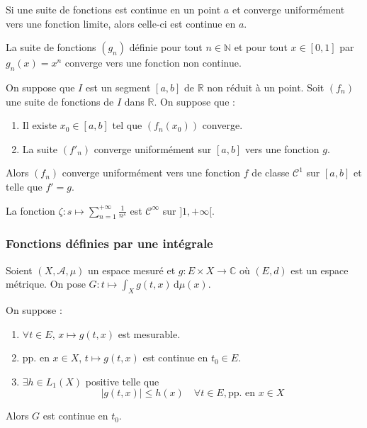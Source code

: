 
	\begin{proposition}
		Si une suite de fonctions est continue en un point $a$ et converge uniformément vers une fonction limite, alors celle-ci est continue en $a$.
	\end{proposition}

	\begin{cexample}
		La suite de fonctions $(g_n)$ définie pour tout $n \in \mathbb{N}$ et pour tout $x \in [0,1]$ par $g_n(x) = x^n$ converge vers une fonction non continue.
	\end{cexample}

	\begin{proposition}
		On suppose que $I$ est un segment $[a,b]$ de $\mathbb{R}$ non réduit à un point. Soit $(f_n)$ une suite de fonctions de $I$ dans $\mathbb{R}$. On suppose que :
		\begin{enumerate}[label=(\roman*)]
			\item Il existe $x_0 \in [a,b]$ tel que $(f_n(x_0))$ converge.
			\item La suite $(f'_n)$ converge uniformément sur $[a,b]$ vers une fonction $g$.
		\end{enumerate}
		Alors $(f_n)$ converge uniformément vers une fonction $f$ de classe $\mathcal{C}^1$ sur $[a,b]$ et telle que $f'=g$.
	\end{proposition}


	\begin{example}
		La fonction $\zeta : s \mapsto \sum_{n=1}^{+\infty} \frac{1}{n^s}$ est $\mathcal{C}^\infty$ sur $]1,+\infty[$.
	\end{example}

	\subsubsection{Fonctions définies par une intégrale}


	Soient $(X, \mathcal{A}, \mu)$ un espace mesuré et $g : E \times X \rightarrow \mathbb{C}$ où $(E, d)$ est un espace métrique. On pose $G : t \mapsto \int_X g(t, x) \, \mathrm{d}\mu(x)$.

	\begin{theorem}
		On suppose :
		\begin{enumerate}[label=(\roman*)]
			\item $\forall t \in E$, $x \mapsto g(t,x)$ est mesurable.
			\item pp. en $x \in X$, $t \mapsto g(t,x)$ est continue en $t_0 \in E$.
			\item $\exists h \in L_1(X)$ positive telle que
			\[ |g(t,x)| \leq h(x) \quad \forall t \in E, \text{pp. en } x \in X \]
		\end{enumerate}
		Alors $G$ est continue en $t_0$.
	\end{theorem}

